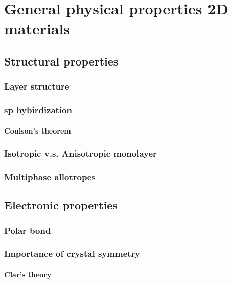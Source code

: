 
\chapter{General physical properties 2D materials \label{chap:3}}

\ifpdf
    \graphicspath{{Chapter3/Figs/Raster/}{Chapter3/Figs/PDF/}{Chapter3/Figs/}}
\else
    \graphicspath{{Chapter3/Figs/Vector/}{Chapter3/Figs/}}
\fi

\section{Structural properties}
\subsection{Layer structure}
\subsection{sp hybirdization}
\subsubsection{Coulson’s theorem}
\subsection{Isotropic v.s. Anisotropic monolayer}
\subsection{Multiphase allotropes}

\section{Electronic properties}
\subsection{Polar bond}
\subsection{Importance of crystal symmetry}
\subsubsection{Clar’s theory}
